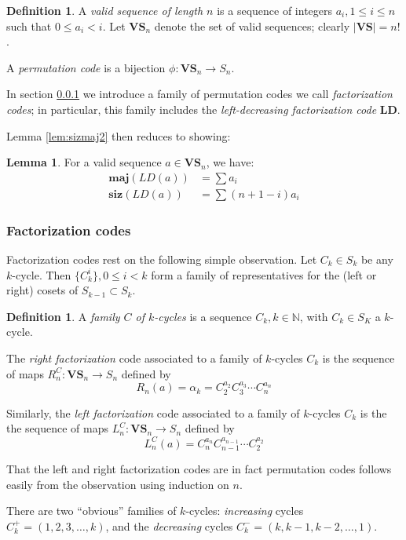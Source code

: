 \documentclass{amsart}[12pt]
\theoremstyle{definition}
\newtheorem{lemma}[dummy]{Lemma}
\newtheorem{definition}[dummy]{Definition}
\newcommand{\N}{\mathbb{N}}
\newcommand{\maj}{\mathbf{maj}}
\newcommand{\siz}{\mathbf{siz}}
\newcommand{\LD}{\mathbf{LD}}
\newcommand{\VS}{\mathbf{VS}}
\begin{document}
\begin{definition}
A \emph{valid sequence of length $n$} is a sequence of integers $a_i, 1\leq i\leq n $ such that $0\leq a_i<i$.  Let $\VS_n$ denote the set of valid sequences; clearly $|\VS|=n!$.

A \emph{permutation code} is a bijection $\phi:\VS_n\to S_n$.
\end{definition}

In section \ref{sec:factorization} we introduce a family of permutation codes we call \emph{factorization codes}; in particular, this family includes the \emph{left-decreasing factorization code} $\LD$.  

Lemma \ref{lem:sizmaj2} then reduces to showing:
\begin{lemma} \label{lem:LDweights}
For a valid sequence $a\in \VS_n$, we have:
\begin{align*}
\maj(LD(a))&=\sum a_i \\
\siz(LD(a))&=\sum (n+1-i) a_i
\end{align*}
\end{lemma}


\subsubsection{Factorization codes} \label{sec:factorization}

Factorization codes rest on the following simple observation.  Let $C_k\in S_k$ be any $k$-cycle.  Then $\{C_k^i\}, 0\leq i < k$ form a family of representatives for the (left or right) cosets of $S_{k-1}\subset S_k$.   

\begin{definition}
A \emph{family $C$ of $k$-cycles} is a sequence $C_k, k\in \N$, with $C_k\in S_K$ a $k$-cycle.

The \emph{right factorization} code associated to a family of $k$-cycles $C_k$ is the sequence of maps $R^C_n:\VS_n\to S_n$ defined by
$$R_n(a)=\alpha_k=C_2^{a_2}C_3^{a_3}\cdots C_n^{a_n}$$

Similarly, the \emph{left factorization} code associated to a family of $k$-cycles $C_k$ is the the sequence of maps $L^C_n:\VS_n\to S_n$ defined by
$$L^C_n(a)=C_n^{a_n}C_{n-1}^{a_{n-1}}\cdots C_2^{a_2}$$
\end{definition}

That the left and right factorization codes are in fact permutation codes follows easily from the observation using induction on $n$.

There are two ``obvious'' families of $k$-cycles:  \emph{increasing} cycles $C^+_k=(1,2,3,\dots,k)$, and the \emph{decreasing} cycles $C^-_k=(k,k-1,k-2,\dots,1)$.  
\end{document}
